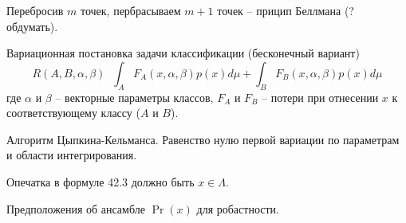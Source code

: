 \documentclass[a4paper]{article}
\newcommand{\defn}{\mathop{\overset{\Delta}{=}}\nolimits}
\begin{document}
Перебросив $m$ точек, пербрасываем $m+1$ точек -- прицип Беллмана (? обдумать).


Вариационная постановка задачи классификации (бесконечный вариант)
\[R(A,B,\alpha,\beta)\defn \int_A F_A(x,\alpha,\beta) p(x) d\mu + \int_B F_B(x,\alpha,\beta) p(x) d\mu\]
где $\alpha$ и $\beta$ -- векторные параметры классов, $F_A$ и $F_B$ -- потери при отнесении $x$ к соответствующему классу ($A$ и $B$).

Алгоритм Цыпкина-Кельманса.
Равенство нулю первой вариации по параметрам и области интегрирования.

Опечатка в формуле 42.3 должно быть $x\in \Lambda$.

Предположения об ансамбле $\Pr(x)$ для робастности.





\end{document}

